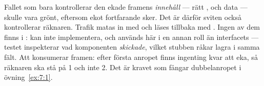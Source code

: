  Fallet som bara kontrollerar den ekade framens \emph{innehåll} --- rätt ,
 och data --- skulle vara grönt, eftersom ekot fortfarande sker. Det är därför sviten
också kontrollerar räknaren.
 Trafik matas in med  och läses tillbaka med .
Ingen av dem finns i :  kan  inte implementera, och
 används här i en annan roll än interfacets --- testet inspekterar vad komponenten
\emph{skickade}, vilket stubben råkar lagra i samma fält.
 Att  konsumerar framen: efter första anropet finns ingenting kvar att eka, så
räknaren ska stå på 1 och inte 2. Det är kravet som fångar dubbelanropet i övning~\ref{ex:7:1}.
